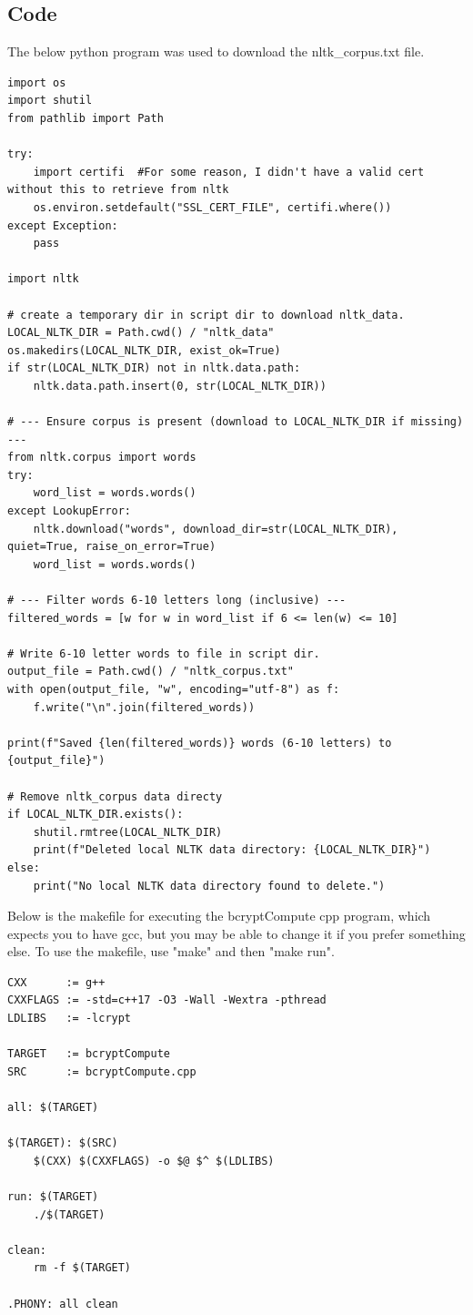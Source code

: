 \documentclass[11pt]{article}
\begin{document}
\subsection*{Code}
The below python program was used to download the nltk\_corpus.txt file.

\begin{lstlisting}
import os
import shutil
from pathlib import Path

try:
    import certifi  #For some reason, I didn't have a valid cert without this to retrieve from nltk
    os.environ.setdefault("SSL_CERT_FILE", certifi.where())
except Exception:
    pass

import nltk

# create a temporary dir in script dir to download nltk_data.
LOCAL_NLTK_DIR = Path.cwd() / "nltk_data"
os.makedirs(LOCAL_NLTK_DIR, exist_ok=True)
if str(LOCAL_NLTK_DIR) not in nltk.data.path:
    nltk.data.path.insert(0, str(LOCAL_NLTK_DIR))

# --- Ensure corpus is present (download to LOCAL_NLTK_DIR if missing) ---
from nltk.corpus import words
try:
    word_list = words.words()
except LookupError:
    nltk.download("words", download_dir=str(LOCAL_NLTK_DIR), quiet=True, raise_on_error=True)
    word_list = words.words()

# --- Filter words 6-10 letters long (inclusive) ---
filtered_words = [w for w in word_list if 6 <= len(w) <= 10]

# Write 6-10 letter words to file in script dir.
output_file = Path.cwd() / "nltk_corpus.txt"
with open(output_file, "w", encoding="utf-8") as f:
    f.write("\n".join(filtered_words))

print(f"Saved {len(filtered_words)} words (6-10 letters) to {output_file}")

# Remove nltk_corpus data directy
if LOCAL_NLTK_DIR.exists():
    shutil.rmtree(LOCAL_NLTK_DIR)
    print(f"Deleted local NLTK data directory: {LOCAL_NLTK_DIR}")
else:
    print("No local NLTK data directory found to delete.")

\end{lstlisting}

Below is the makefile for executing the bcryptCompute cpp program, which expects you to have gcc, but you may be able to change it if you prefer something else. To use the makefile, use "make" and then "make run".
\begin{lstlisting}
CXX      := g++
CXXFLAGS := -std=c++17 -O3 -Wall -Wextra -pthread
LDLIBS   := -lcrypt

TARGET   := bcryptCompute
SRC      := bcryptCompute.cpp

all: $(TARGET)

$(TARGET): $(SRC)
	$(CXX) $(CXXFLAGS) -o $@ $^ $(LDLIBS)

run: $(TARGET)
	./$(TARGET)

clean:
	rm -f $(TARGET)

.PHONY: all clean

\end{lstlisting}
\end{document}
